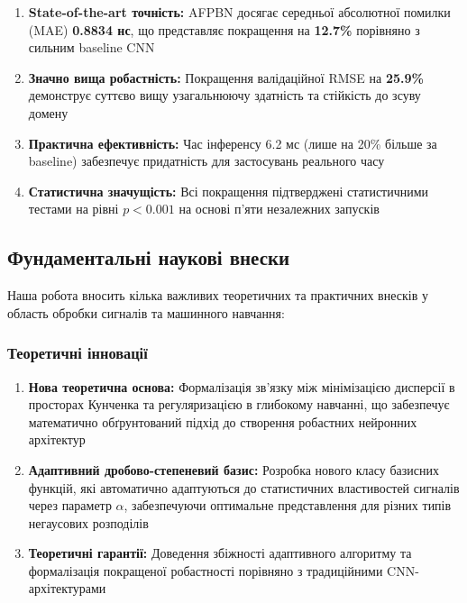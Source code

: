 \documentclass[12pt,a4paper]{article}
\begin{document}
\begin{enumerate}
	\item \textbf{State-of-the-art точність:} AFPBN досягає середньої абсолютної помилки (MAE) \textbf{0.8834 нс}, що представляє покращення на \textbf{12.7\%} порівняно з сильним baseline CNN
	
	\item \textbf{Значно вища робастність:} Покращення валідаційної RMSE на \textbf{25.9\%} демонструє суттєво вищу узагальнюючу здатність та стійкість до зсуву домену
	
	\item \textbf{Практична ефективність:} Час інференсу 6.2 мс (лише на 20\% більше за baseline) забезпечує придатність для застосувань реального часу
	
	\item \textbf{Статистична значущість:} Всі покращення підтверджені статистичними тестами на рівні $p < 0.001$ на основі п'яти незалежних запусків
\end{enumerate}

\subsection{Фундаментальні наукові внески}

Наша робота вносить кілька важливих теоретичних та практичних внесків у область обробки сигналів та машинного навчання:

\subsubsection{Теоретичні інновації}

\begin{enumerate}
	\item \textbf{Нова теоретична основа:} Формалізація зв'язку між мінімізацією дисперсії в просторах Кунченка та регуляризацією в глибокому навчанні, що забезпечує математично обґрунтований підхід до створення робастних нейронних архітектур
	
	\item \textbf{Адаптивний дробово-степеневий базис:} Розробка нового класу базисних функцій, які автоматично адаптуються до статистичних властивостей сигналів через параметр $\alpha$, забезпечуючи оптимальне представлення для різних типів негаусових розподілів
	
	\item \textbf{Теоретичні гарантії:} Доведення збіжності адаптивного алгоритму та формалізація покращеної робастності порівняно з традиційними CNN-архітектурами
\end{enumerate}
\end{document}
